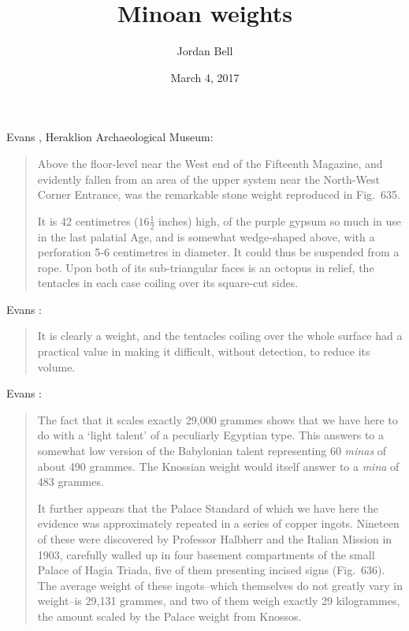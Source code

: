 \documentclass{article}
\title{Minoan weights}
\author{Jordan Bell}
\date{March 4, 2017}
\begin{document}
\maketitle

Evans \cite[p.~650]{knossosIV2}, Heraklion Archaeological Museum:

\begin{quote}
Above the floor-level near the West end of the Fifteenth Magazine, and
evidently fallen from an area of the upper system near the North-West
Corner Entrance, was the remarkable stone weight reproduced in Fig.~635.

It is 42 centimetres ($16\frac{1}{2}$ inches) high, of the purple gypsum so much in
use in the last palatial Age, and is somewhat wedge-shaped above, with
a perforation 5-6 centimetres in diameter. It could thus be suspended 
from a rope. Upon both of its sub-triangular faces is an octopus in relief,
the tentacles in each case coiling over its square-cut sides.
\end{quote}

Evans \cite[p.~651]{knossosIV2}:

\begin{quote}
It is clearly a weight, and the tentacles
coiling over the whole surface had a practical
value in making it difficult, without detection,
to reduce its volume.
\end{quote}

Evans \cite[pp.~651--652]{knossosIV2}:

\begin{quote}
The fact that it scales
exactly 29,000 grammes shows that we have here to do with a `light talent'
of a peculiarly Egyptian type. This answers to a somewhat low version
of the Babylonian talent representing 60 {\em minas} of about 490 grammes. The
Knossian weight would itself answer to a {\em mina} of 483 grammes.

It further appears that the Palace Standard of which we have here the
evidence was approximately repeated in a series of copper ingots. Nineteen
of these were discovered by Professor Halbherr and the Italian Mission in
1903, carefully walled up in four basement compartments of the small
Palace of Hagia Triada, five of them presenting incised signs (Fig.~636).
The average weight of these ingots--which themselves do not greatly vary
in weight--is 29,131 grammes, and two of them weigh exactly 29
kilogrammes, the amount scaled by the Palace weight from Knossos.
\end{quote}
\end{document}
